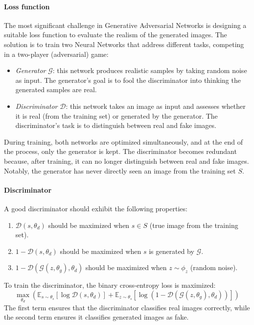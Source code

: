 \paragraph*{Loss function}
The most significant challenge in Generative Adversarial Networks is designing a suitable loss function to evaluate the realism of the generated images. 
The solution is to train two Neural Networks that address different tasks, competing in a two-player (adversarial) game:
\begin{itemize}
    \item \textit{Generator} $\mathcal{G}$: this network produces realistic samples by taking random noise as input. 
        The generator's goal is to fool the discriminator into thinking the generated samples are real.
    \item \textit{Discriminator} $\mathcal{D}$: this network takes an image as input and assesses whether it is real (from the training set) or generated by the generator. 
        The discriminator's task is to distinguish between real and fake images.
\end{itemize}
During training, both networks are optimized simultaneously, and at the end of the process, only the generator is kept. 
The discriminator becomes redundant because, after training, it can no longer distinguish between real and fake images. 
Notably, the generator has never directly seen an image from the training set $S$.

\paragraph*{Discriminator}
A good discriminator should exhibit the following properties:
\begin{enumerate}
    \item $\mathcal{D}(s,\theta_d)$ should be maximized when $s\in S$ (true image from the training set).
    \item $1-\mathcal{D}(s,\theta_d)$ should be maximized when $s$ is generated by $\mathcal{G}$. 
    \item $1-\mathcal{D}(\mathcal{G}(z,\theta_g),\theta_d)$ should be maximized when $z\sim\phi_z$ (random noise).
\end{enumerate}
To train the discriminator, the binary cross-entropy loss is maximized:
\[\max_{\theta_d}\left(\mathbb{E}_{s\sim \theta_s}[\log\mathcal{D}(s,\theta_d)]+\mathbb{E}_{z\sim\theta_s}[\log\left(1-\mathcal{D}(\mathcal{G}(z,\theta_g),\theta_d)\right)]\right)\]
The first term ensures that the discriminator classifies real images correctly, while the second term ensures it classifies generated images as fake.

